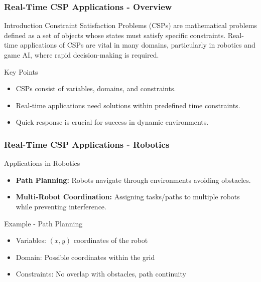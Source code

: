 \documentclass[aspectratio=169]{beamer}
\begin{document}
\begin{frame}[fragile]
    \frametitle{Real-Time CSP Applications - Overview}
    \begin{block}{Introduction}
        Constraint Satisfaction Problems (CSPs) are mathematical problems defined as a set of objects whose states must satisfy specific constraints. Real-time applications of CSPs are vital in many domains, particularly in robotics and game AI, where rapid decision-making is required.
    \end{block}
    
    \begin{block}{Key Points}
        \begin{itemize}
            \item CSPs consist of variables, domains, and constraints.
            \item Real-time applications need solutions within predefined time constraints.
            \item Quick response is crucial for success in dynamic environments.
        \end{itemize}
    \end{block}
\end{frame}

\begin{frame}[fragile]
    \frametitle{Real-Time CSP Applications - Robotics}
    \begin{block}{Applications in Robotics}
        \begin{itemize}
            \item \textbf{Path Planning:} Robots navigate through environments avoiding obstacles.
            \item \textbf{Multi-Robot Coordination:} Assigning tasks/paths to multiple robots while preventing interference.
        \end{itemize}
    \end{block}
    
    \begin{exampleblock}{Example - Path Planning}
        \begin{itemize}
            \item Variables: \((x, y)\) coordinates of the robot
            \item Domain: Possible coordinates within the grid
            \item Constraints: No overlap with obstacles, path continuity
        \end{itemize}
    \end{exampleblock}
\end{frame}
\end{document}
